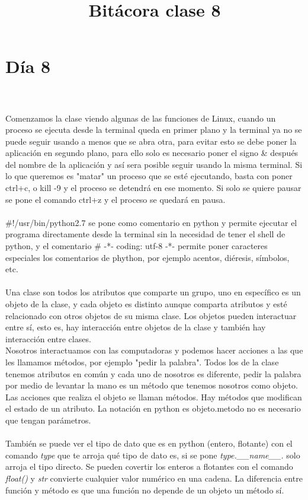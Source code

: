\documentclass{book}
\begin{document}
	\section{Día 8}
	\title{\Huge Bitácora clase 8} \\
	\\
	Comenzamos la clase viendo algunas de las funciones de Linux, cuando un proceso se ejecuta desde la terminal queda en primer plano y la terminal ya no se puede seguir usando a menos que se abra otra, para evitar esto se debe poner la aplicación en segundo plano, para ello solo es necesario poner el signo \& después del nombre de la aplicación y así sera posible seguir usando la misma terminal. Si lo que queremos es "matar" un proceso que se esté ejecutando, basta con poner ctrl+c, o kill -9 y el proceso se detendrá en ese momento. Si solo se quiere pausar se pone el comando ctrl+z y el proceso se quedará en pausa. \\
	\\
	\#!/usr/bin/python2.7 se pone como comentario en python y permite ejecutar el programa directamente desde la terminal sin la necesidad de tener el shell de python, y el comentario \# -*- coding: utf-8 -*- permite poner caracteres especiales los comentarios de phython, por ejemplo acentos, diéresis, símbolos, etc.\\
	\\
	Una clase son todos los atributos que comparte un grupo, uno en específico es un objeto de la clase, y cada objeto es distinto aunque comparta atributos y esté relacionado con otros objetos de su misma clase. Los objetos pueden interactuar entre sí, esto es, hay interacción entre objetos de la clase y también hay interacción entre clases.\\
	Nosotros interactuamos con las computadoras y podemos hacer acciones a las que les llamamos métodos, por ejemplo "pedir la palabra". Todos los de la clase tenemos atributos en común y cada uno de nosotros es diferente, pedir la palabra por medio de levantar la mano es un método que tenemos nosotros como objeto. Las acciones que realiza el objeto se llaman métodos. Hay métodos que modifican el estado de un atributo.
	La notación en python es objeto.metodo no es necesario que tengan parámetros.\\
	\\
	También se puede ver el tipo de dato que es en python (entero, flotante) con el comando \textit{type} que te arroja qué tipo de dato es, si se pone \textit{type.\_\_name\_\_.} solo arroja el tipo directo. Se pueden covertir los enteros a flotantes con el comando \textit{float()} y  \textit{str} convierte cualquier valor numérico en una cadena. La diferencia entre función y método es que una función no depende de un objeto un método sí.\\
\end{document}
